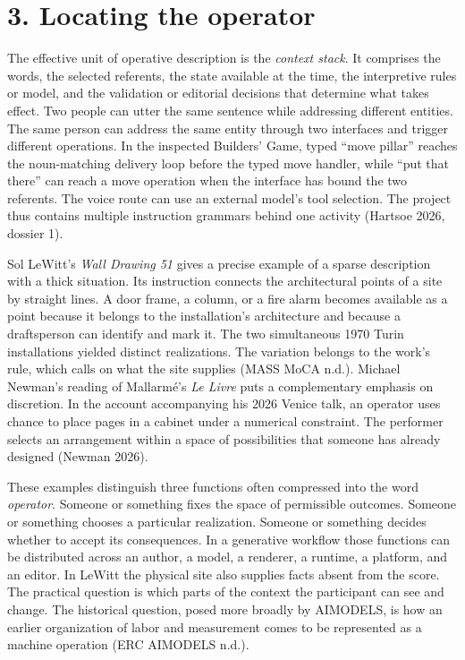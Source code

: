 \documentclass[
  11pt,
  letterpaper,
]{article}
\begin{document}
\hypertarget{locating-the-operator}{%
\section{3. Locating the operator}\label{locating-the-operator}}

The effective unit of operative description is the \emph{context stack}.
It comprises the words, the selected referents, the state available at
the time, the interpretive rules or model, and the validation or
editorial decisions that determine what takes effect. Two people can
utter the same sentence while addressing different entities. The same
person can address the same entity through two interfaces and trigger
different operations. In the inspected Builders' Game, typed ``move
pillar'' reaches the noun-matching delivery loop before the typed move
handler, while ``put that there'' can reach a move operation when the
interface has bound the two referents. The voice route can use an
external model's tool selection. The project thus contains multiple
instruction grammars behind one activity (Hartsoe 2026, dossier 1).

Sol LeWitt's \emph{Wall Drawing 51} gives a precise example of a sparse
description with a thick situation. Its instruction connects the
architectural points of a site by straight lines. A door frame, a
column, or a fire alarm becomes available as a point because it belongs
to the installation's architecture and because a draftsperson can
identify and mark it. The two simultaneous 1970 Turin installations
yielded distinct realizations. The variation belongs to the work's rule,
which calls on what the site supplies (MASS MoCA n.d.). Michael Newman's
reading of Mallarmé's \emph{Le Livre} puts a complementary emphasis on
discretion. In the account accompanying his 2026 Venice talk, an
operator uses chance to place pages in a cabinet under a numerical
constraint. The performer selects an arrangement within a space of
possibilities that someone has already designed (Newman 2026).

These examples distinguish three functions often compressed into the
word \emph{operator}. Someone or something fixes the space of
permissible outcomes. Someone or something chooses a particular
realization. Someone or something decides whether to accept its
consequences. In a generative workflow those functions can be
distributed across an author, a model, a renderer, a runtime, a
platform, and an editor. In LeWitt the physical site also supplies facts
absent from the score. The practical question is which parts of the
context the participant can see and change. The historical question,
posed more broadly by AIMODELS, is how an earlier organization of labor
and measurement comes to be represented as a machine operation (ERC
AIMODELS n.d.).
\end{document}
